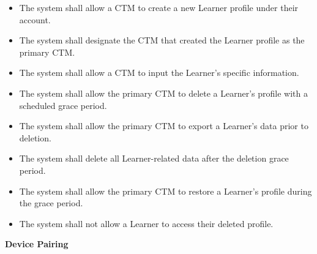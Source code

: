 \documentclass[12pt]{article}
\newcounter{reqnumL} %
\begin{document}
\noindent \begin{itemize}

  \setcounter{reqnumL}{0}

  \item[\refstepcounter{reqnumL}\thereqnumL \label{FR-LRN-1}:] The system shall allow a CTM to create a new Learner profile under their account.

  \item[\refstepcounter{reqnumL}\thereqnumL \label{FR-LRN-2}:] The system shall designate the CTM that created the Learner profile as the primary CTM.

  \item[\refstepcounter{reqnumL}\thereqnumL \label{FR-LRN-3}:] The system shall allow a CTM to input the Learner's specific information.

  \item[\refstepcounter{reqnumL}\thereqnumL \label{FR-LRN-4}:] The system shall allow the primary CTM to delete a Learner's profile with a scheduled grace period.

  \item[\refstepcounter{reqnumL}\thereqnumL \label{FR-LRN-5}:] The system shall allow the primary CTM to export a Learner's data prior to deletion.

  \item[\refstepcounter{reqnumL}\thereqnumL \label{FR-LRN-6}:] The system shall delete all Learner-related data after the deletion grace period.

  \item[\refstepcounter{reqnumL}\thereqnumL \label{FR-LRN-7}:] The system shall allow the primary CTM to restore a Learner's profile during the grace period.

  \item[\refstepcounter{reqnumL}\thereqnumL \label{FR-LRN-8}:] The system shall not allow a Learner to access their deleted profile.

\end{itemize}

\noindent \textbf{Device Pairing}
\end{document}
